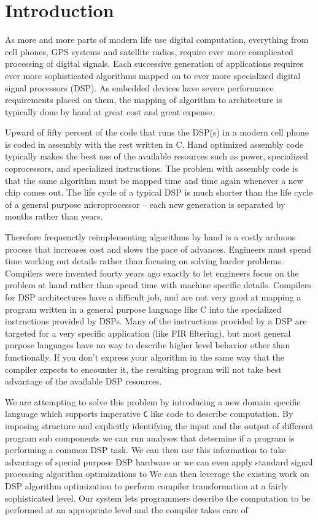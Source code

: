 \section{Introduction}
As more and more parts of modern life use digital computation, everything from cell phones, GPS systems
and satellite radios, require ever more complicated processing of digital signals. 
Each successive generation of applications requires ever more sophisticated algorithms mapped 
on to ever more specialized digital signal processors (DSP). As 
embedded devices have severe performance requirements placed on them,
the mapping of algorithm to architecture is typically done by hand at great cost and great expense.

Upward of fifty percent of the code that runs the DSP(s) in a modern cell phone is coded in assembly
with the rest written in C. Hand optimized assembly code typically makes the best use of the 
available resources such as power, specialized coprocessors, and specialized instructions.
The problem with assembly code is that the same algorithm must be mapped time and time again 
whenever a new chip comes out. The life cycle of a typical DSP is much shorter than the life
cycle of a general purpose microprocessor -- each new generation is separated by months rather
than years.
 
Therefore frequenctly reimplementing algorithms by hand is a costly arduous process that 
increases cost and slows the pace of advances. Engineers must spend time working out details rather 
than focusing on solving harder problems. Compilers were invented fourty years ago 
exactly to let engineers focus on the problem at hand rather than spend time with 
machine specific details. Compilers for DSP architectures have a difficult job, and are not
very good at mapping a program written in a general purpose language like C into the specialized 
instructions provided by DSPs. Many of the instructions provided by a DSP are targeted 
for a very specific application (like FIR filtering), but most general purpose languages have
no way to describe higher level behavior other than functionally. If you don't express
your algorithm in the same way that the compiler expects to encounter it, the resulting
program will not take best advantage of the available DSP resources.

We are attempting to solve this problem by introducing a new domain specific language which
supports imperative {\tt C} like code to describe computation. By imposing structure and
explicitly identifying the input and the output of different program sub components
we can run analyses that determine if a program is performing a common DSP task.  
We can then use this information to take advantage of special purpose DSP hardware
or we can even apply standard signal processing algorithm optimizations to 
We can then leverage the existing work on DSP algorithm optimization to perform compiler transformation
at a fairly sophisticated level. Our system lets programmers describe the
computation to be performed at an appropriate level and the compiler takes care of 

